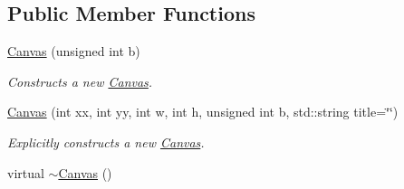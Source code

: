 \subsection*{Public Member Functions}
\begin{DoxyCompactItemize}
\item 
\hyperlink{class_canvas_af80a3103714083bcc2893fbf1f2b72c8}{Canvas} (unsigned int b)
\begin{DoxyCompactList}\small\item\em Constructs a new \hyperlink{class_canvas}{Canvas}. \end{DoxyCompactList}\item 
\hyperlink{class_canvas_a8d81d354d3e6b3229650f2a864750b5b}{Canvas} (int xx, int yy, int w, int h, unsigned int b, std\+::string title=\char`\"{}\char`\"{})
\begin{DoxyCompactList}\small\item\em Explicitly constructs a new \hyperlink{class_canvas}{Canvas}. \end{DoxyCompactList}\item 
\hypertarget{class_canvas_a237c4549ad2e27c729cd1f71e89f0fd9}{virtual \hyperlink{class_canvas_a237c4549ad2e27c729cd1f71e89f0fd9}{$\sim$\+Canvas} ()}\label{class_canvas_a237c4549ad2e27c729cd1f71e89f0fd9}


\end{DoxyCompactItemize}
